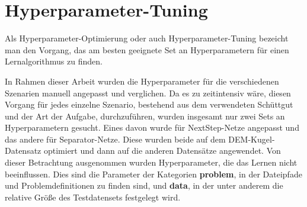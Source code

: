 \section{Hyperparameter-Tuning}









Als Hyperparameter-Optimierung oder auch Hyperparameter-Tuning bezeicht man den Vorgang, das am besten geeignete Set an 
Hyperparametern für einen Lernalgorithmus zu finden.

In Rahmen dieser Arbeit wurden die Hyperparameter für die verschiedenen Szenarien manuell angepasst und verglichen.
Da es zu zeitintensiv wäre, diesen Vorgang für jedes einzelne Szenario, bestehend aus dem verwendeten Schüttgut und der Art der Aufgabe, durchzuführen,
wurden insgesamt nur zwei Sets an Hyperparametern gesucht.
Eines davon wurde für NextStep-Netze angepasst und das andere für Separator-Netze.
Diese wurden beide auf dem DEM-Kugel-Datensatz optimiert und dann auf die anderen Datensätze angewendet.
Von dieser Betrachtung ausgenommen wurden Hyperparameter, die das Lernen nicht beeinflussen.
Dies sind die Parameter der Kategorien {\sffamily \textbf{problem}}, in der Dateipfade und Problemdefinitionen zu finden sind, 
und {\sffamily \textbf{data}}, in der unter anderem die relative Größe des Testdatensets festgelegt wird.


